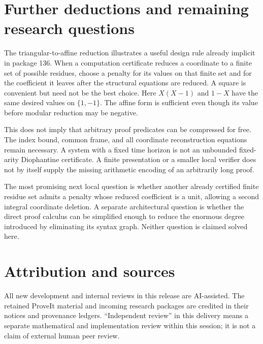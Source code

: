 \documentclass[11pt,letterpaper]{article}
\theoremstyle{definition}\newtheorem{definition}[theorem]{Definition}
\theoremstyle{remark}\newtheorem{remark}[theorem]{Remark}
\begin{document}
\section{Further deductions and remaining research questions}
The triangular-to-affine reduction illustrates a useful design rule already implicit in package 136. When a computation certificate reduces a coordinate to a finite set of possible residues, choose a penalty for its values on that finite set and for the coefficient it leaves after the structural equations are reduced. A square is convenient but need not be the best choice. Here $X(X-1)$ and $1-X$ have the same desired values on $\{1,-1\}$. The affine form is sufficient even though its value before modular reduction may be negative.

This does not imply that arbitrary proof predicates can be compressed for free. The index bound, common frame, and all coordinate reconstruction equations remain necessary. A system with a fixed time horizon is not an unbounded fixed-arity Diophantine certificate. A finite presentation or a smaller local verifier does not by itself supply the missing arithmetic encoding of an arbitrarily long proof.

The most promising next local question is whether another already certified finite residue set admits a penalty whose reduced coefficient is a unit, allowing a second integral coordinate deletion. A separate architectural question is whether the direct proof calculus can be simplified enough to reduce the enormous degree introduced by eliminating its syntax graph. Neither question is claimed solved here.

\section*{Attribution and sources}
All new development and internal reviews in this release are AI-assisted. The retained ProveIt material and incoming research packages are credited in their notices and provenance ledgers. ``Independent review'' in this delivery means a separate mathematical and implementation review within this session; it is not a claim of external human peer review.
\end{document}
